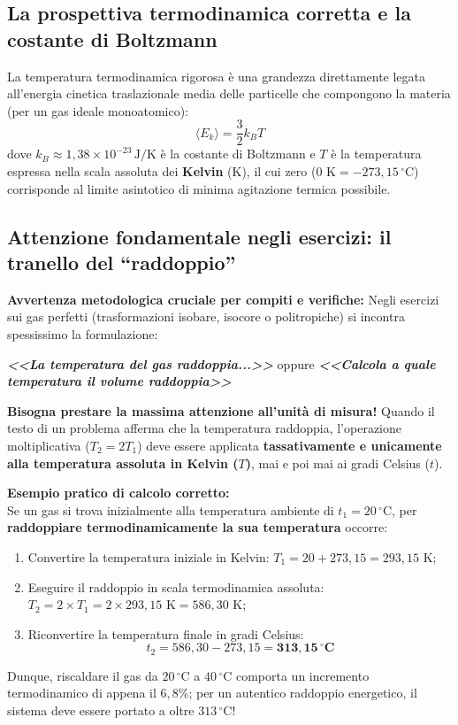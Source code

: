 \documentclass[11pt,a4paper,oneside]{report}
\begin{document}
\begin{approfondimento}
\subsection*{La prospettiva termodinamica corretta e la costante di Boltzmann}
La temperatura termodinamica rigorosa \`e una grandezza direttamente legata all'energia cinetica traslazionale media delle particelle che compongono la materia (per un gas ideale monoatomico):
\[
\langle E_k \rangle = \frac{3}{2} k_B T
\]
dove $k_B \approx 1{,}38 \times 10^{-23}\,\text{J/K}$ \`e la costante di Boltzmann e $T$ \`e la temperatura espressa nella scala assoluta dei \textbf{Kelvin} ($\text{K}$), il cui zero ($0\text{ K} = -273{,}15\,{^\circ}\text{C}$) corrisponde al limite asintotico di minima agitazione termica possibile.

\subsection*{Attenzione fondamentale negli esercizi: il tranello del ``raddoppio''}
\textbf{Avvertenza metodologica cruciale per compiti e verifiche:} Negli esercizi sui gas perfetti (trasformazioni isobare, isocore o politropiche) si incontra spessissimo la formulazione:
\begin{center}
\textit{\textbf{<<La temperatura del gas raddoppia...>>}} \quad oppure \quad \textit{\textbf{<<Calcola a quale temperatura il volume raddoppia>>}}
\end{center}
\textbf{Bisogna prestare la massima attenzione all'unit\`a di misura!} Quando il testo di un problema afferma che la temperatura raddoppia, l'operazione moltiplicativa ($T_2 = 2 T_1$) deve essere applicata \textbf{tassativamente e unicamente alla temperatura assoluta in Kelvin ($T$)}, mai e poi mai ai gradi Celsius ($t$).

\textbf{Esempio pratico di calcolo corretto:}\\
Se un gas si trova inizialmente alla temperatura ambiente di $t_1 = 20\,{^\circ}\text{C}$, per \textbf{raddoppiare termodinamicamente la sua temperatura} occorre:
\begin{enumerate}[leftmargin=*, nosep]
  \item Convertire la temperatura iniziale in Kelvin: $T_1 = 20 + 273{,}15 = 293{,}15\text{ K}$;
  \item Eseguire il raddoppio in scala termodinamica assoluta: $T_2 = 2 \times T_1 = 2 \times 293{,}15\text{ K} = 586{,}30\text{ K}$;
  \item Riconvertire la temperatura finale in gradi Celsius:
  \[
  t_2 = 586{,}30 - 273{,}15 = \mathbf{313{,}15\,{^\circ}\text{C}}
  \]
\end{enumerate}
Dunque, riscaldare il gas da $20\,{^\circ}\text{C}$ a $40\,{^\circ}\text{C}$ comporta un incremento termodinamico di appena il $6{,}8\%$; per un autentico raddoppio energetico, il sistema deve essere portato a oltre \textbf{$313\,{^\circ}\text{C}$}!


\end{approfondimento}
\end{document}
